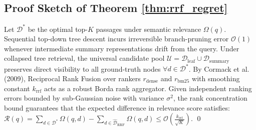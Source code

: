\documentclass[11pt,a4paper]{article}
\begin{document}
\subsection*{Proof Sketch of Theorem \ref{thm:rrf_regret}}
Let $\mathcal{D}^*$ be the optimal top-$K$ passages under semantic relevance $\Omega(q)$. Sequential top-down tree descent incurs irreversible branch-pruning error $\mathcal{O}(1)$ whenever intermediate summary representations drift from the query. Under collapsed tree retrieval, the universal candidate pool $\mathcal{U} = \mathcal{D}_{\text{leaf}} \cup \mathcal{D}_{\text{summary}}$ preserves direct visibility to all ground-truth nodes $\forall d \in \mathcal{D}^*$. By Cormack et al. (2009), Reciprocal Rank Fusion over rankers $r_{\text{dense}}$ and $r_{\text{bm25}}$ with smoothing constant $k_{\text{rrf}}$ acts as a robust Borda rank aggregator. Given independent ranking errors bounded by sub-Gaussian noise with variance $\sigma^2$, the rank concentration bound guarantees that the expected difference in relevance score satisfies:
$\mathcal{R}(q) = \sum_{d \in \mathcal{D}^*} \Omega(q, d) - \sum_{d \in \hat{\mathcal{D}}_{\text{RRF}}} \Omega(q, d) \le \mathcal{O}\left(\frac{k_{\text{rrf}}}{\sqrt{K}}\right)$. \qed



\end{document}
